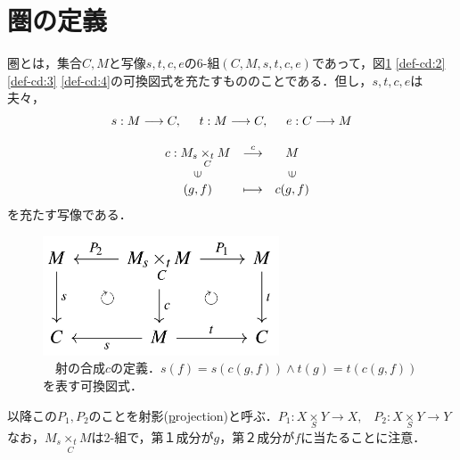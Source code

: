 \documentclass[uplatex, 12pt, a4paper, dvipdfmx]{jsarticle}
\begin{document}
\section{圏の定義}
\begin{shadebox}\begin{definition}[圏]圏とは，集合$C,M$と写像$s,t,c,e$の6-組$(C,M,s,t,c,e)$であって，図\ref{def-cd:1} \ref{def-cd:2} \ref{def-cd:3} \ref{def-cd:4}の可換図式を充たすもののことである．但し，$s,t,c,e$は夫々，\begin{eqnarray*}s:M\longrightarrow C,\hspace{5mm} t:M\longrightarrow C, \hspace{5mm} e:C\longrightarrow M\\[3mm] \left. 
\begin{array}{ccc}
    c:M_s\underset{C}{\times_t}M & \stackrel{c}{\longrightarrow} & M \\
    \rotatebox{90}{$\in$} & & \rotatebox{90}{$\in$} \\
    (g,f) & \longmapsto & c(g,f)
\end{array} \right. \hspace{10mm} \end{eqnarray*}を充たす写像である．

\vspace{1mm} \end{definition}\end{shadebox}

\begin{figure}[ht] \begin{center}  \caption{\label{def-cd:1}　射の合成$c$の定義．$s(f)=s(c(g,f))\wedge t(g)=t(c(g,f))$を表す可換図式．}
    \includegraphics[width=7cm]{cd-1.png}
\end{center}\end{figure}
以降この$P_1, P_2$のことを射影(\underline{p}rojection)と呼ぶ．\hspace{6mm}$P_1: X\underset{S}{\times}Y \longrightarrow X, \; \; \; P_2: X\underset{S}{\times}Y \longrightarrow Y$\\
なお，$M_s\underset{C}{\times_t}M$は2-組で，第１成分が$g$，第２成分が$f$に当たることに注意．
\end{document}
